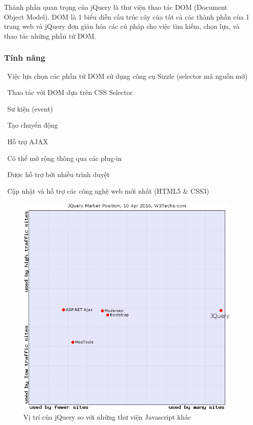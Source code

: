 \documentclass[12pt,a4paper,oneside]{article}
\begin{document}
Thành phần quan trọng của jQuery là thư viện thao tác DOM (Document Object Model). DOM là 1 biểu diễn cấu trúc cây của tất cả các thành phần của 1 trang web và jQuery đơn giản hóa các cú pháp cho việc tìm kiếm, chọn lựa, và thao tác những phần tử DOM.

\subsubsection{Tính năng}
\indent \indent \textbullet \ Việc lựa chọn các phần tử DOM sử dụng công cụ Sizzle (selector mã nguồn mở)

\indent \textbullet \ Thao tác với DOM dựa trên CSS Selector

\indent \textbullet \ Sư kiện (event)

\indent \textbullet \ Tạo chuyển động

\indent \textbullet \ Hỗ trợ AJAX

\indent \textbullet \ Có thể mở rộng thông qua các plug-in

\indent \textbullet \ Được hỗ trợ bởi nhiều trình duyệt

\indent \textbullet \ Cập nhật và hỗ trợ các công nghệ web mới nhất (HTML5 \& CSS3)

\begin{center}
    \begin{figure}[htp]
    \begin{center}
     \includegraphics[scale=.6]{image/js-jquery}
    \end{center}
    \caption{Vị trí của jQuery so với những thư viện Javascript khác}
    \label{refhinh13}
    \end{figure}
\end{center}
\end{document}
